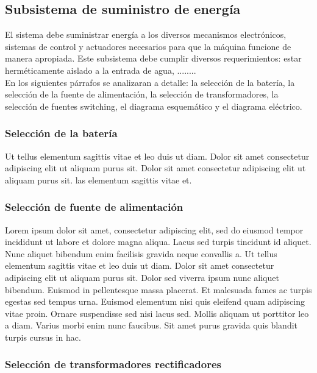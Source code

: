 \subsection{Subsistema de suministro de energía}
\label{ssec:subsistema de suministro de energia}

El sistema debe suministrar energía a los diversos mecanismos electrónicos, sistemas de control y actuadores necesarios para que la máquina funcione de manera apropiada. Este subsistema debe cumplir diversos requerimientos: estar herméticamente aislado a la entrada de agua, ........\\
En los siguientes párrafos se analizaran a detalle: la selección de la batería, la selección de la fuente de alimentación, la selección de transformadores, la selección de fuentes switching, el diagrama esquemático y el diagrama eléctrico.



\subsubsection{Selección de la batería} 

Ut tellus elementum sagittis vitae et leo duis ut diam. Dolor sit amet consectetur adipiscing elit ut aliquam purus sit.  Dolor sit amet consectetur adipiscing elit ut aliquam purus sit. las elementum sagittis vitae et.


\subsubsection{Selección de fuente de alimentación} 

Lorem ipsum dolor sit amet, consectetur adipiscing elit, sed do eiusmod tempor incididunt ut labore et dolore magna aliqua. Lacus sed turpis tincidunt id aliquet. Nunc aliquet bibendum enim facilisis gravida neque convallis a. Ut tellus elementum sagittis vitae et leo duis ut diam. Dolor sit amet consectetur adipiscing elit ut aliquam purus sit. Dolor sed viverra ipsum nunc aliquet bibendum. Euismod in pellentesque massa placerat. Et malesuada fames ac turpis egestas sed tempus urna. Euismod elementum nisi quis eleifend quam adipiscing vitae proin. Ornare suspendisse sed nisi lacus sed. Mollis aliquam ut porttitor leo a diam. Varius morbi enim nunc faucibus. Sit amet purus gravida quis blandit turpis cursus in hac.

\subsubsection{Selección de transformadores rectificadores}


